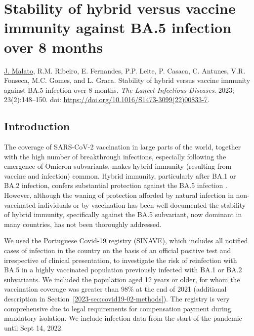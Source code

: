 \chapter[Stability of hybrid vs. vaccine immunity against BA.5 infection over 8 months]{Stability of hybrid versus vaccine immunity against BA.5 infection over 8 months}
\label{chapter:2023-covid19-02}

\noindent\underline{J. Malato}, R.M. Ribeiro, E. Fernandes, P.P. Leite, P. Casaca, C. Antunes, V.R. Fonseca, M.C. Gomes, and L. Graca. Stability of hybrid versus vaccine immunity against BA.5 infection over 8 months. \textit{The Lancet Infectious Diseases}. 2023; 23(2):148--150. doi: \url{https://doi.org/10.1016/S1473-3099(22)00833-7}.


\section{Introduction}

The coverage of SARS-CoV-2 vaccination in large parts of the world, together with the high number of breakthrough infections, especially following the emergence of Omicron subvariants, makes hybrid immunity (resulting from vaccine and infection) common. Hybrid immunity, particularly after BA.1 or BA.2 infection, confers substantial protection against the BA.5 infection \citep{malatoRiskBAInfection2022, altarawneh2022ProtectiveEffect, hansen2023RiskReinfection}. However, although the waning of protection afforded by natural infection in non-vaccinated individuals or by vaccination has been well documented \citep{chemaitelly2021WaningBNT162b2, goldberg2022ProtectionWaning} the stability of hybrid immunity, specifically against the BA.5 subvariant, now dominant in many countries, has not been thoroughly addressed.

We used the Portuguese Covid-19 registry (SINAVE), which includes all notified cases of infection in the country on the basis of an official positive test and irrespective of clinical presentation, to investigate the risk of reinfection with BA.5 in a highly vaccinated population previously infected with BA.1 or BA.2 subvariants. We included the population aged 12 years or older, for whom the vaccination coverage was greater than 98\% at the end of 2021 (additional description in Section~\ref{2023-sec:covid19-02-methods}). The registry is very comprehensive due to legal requirements for compensation payment during mandatory isolation. We include infection data from the start of the pandemic until Sept 14, 2022.

